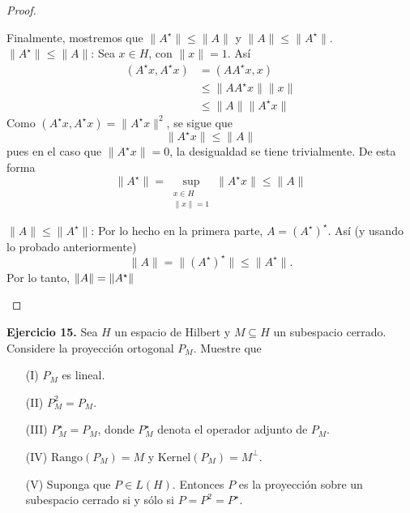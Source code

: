 \begin{proof}
\begin{enumerate}
Finalmente, mostremos que $\|A^\star\| \le \|A\|$ y $\|A\| \le \|A^\star\|$. \\

\checkmark$\|A^\star\| \le \|A\|$: Sea $x \in H$, con $\|x\|=1$. Así
\begin{align*}
(A^\star x, A^\star x) &= (A A^\star x, x) \\
&\le \|A A^\star x\| \|x\| \\
&\le \|A\| \|A^\star x\| 
\end{align*}
Como $(A^\star x, A^\star x) = \|A^\star x\|^2$, se sigue que
\[
\|A^\star x\| \leq \|A\|
\]
pues en el caso que $\|A^\star x\|=0$, la desigualdad se tiene trivialmente. De esta forma
\[
\|A^\star\| = \sup_{\substack{x \in H \\ \|x\|=1}} \|A^\star x\| \le \|A\|
\]

\checkmark$\|A\| \le \|A^\star\|$: 
Por lo hecho en la primera parte, $A = (A^\star)^\star$.
Así (y usando lo probado anteriormente)
\[
\|A\| = \|(A^\star)^\star\| \le \|A^\star\|. 
\] 
Por lo tanto, $\left\|A\right\|=\left\|A^{\star}\right\|$
 
    \end{enumerate}
\end{proof}
\textbf{Ejercicio 15.} Sea $H$ un espacio de Hilbert y $M\subseteq H$ un subespacio cerrado. Considere la proyección ortogonal $P_M$. Muestre que 
\begin{enumerate}
    \item[(I)] $P_M$ es lineal.
    \item[(II)] $P_M^2=P_M$.
    \item[(III)] $P_M^\star=P_M$, donde $P_M^\star$ denota el operador adjunto de $P_M$.
    \item[(IV)] $\text{Rango}(P_M)=M$ y $\text{Kernel}(P_M)=M^\perp$.
    \item[(V)] Suponga que $P \in L(H)$. Entonces $P$ es la proyección sobre un subespacio cerrado si y sólo si $P=P^2=P^\star$.
\end{enumerate}

